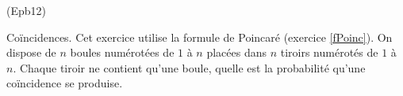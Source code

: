 \begin{tiny}(Epb12)\end{tiny} Coïncidences.\newline
Cet exercice utilise la formule de Poincaré (exercice \ref{fPoinc}).
On dispose de $n$ boules numérotées de $1$ à $n$ placées dans $n$ tiroirs numérotés de $1$ à $n$. Chaque tiroir ne contient qu'une boule, quelle est la probabilité qu'une coïncidence se produise. 